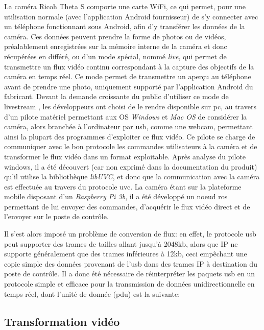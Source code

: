 			La caméra Ricoh Theta S comporte une carte WiFi, ce qui permet, pour une utilisation \og normale \fg{} (avec l'application Android fournisseur) de s'y connecter avec un téléphone fonctionnant sous Android, afin d'y transférer les données de la caméra. Ces données peuvent prendre la forme de photos ou de vidéos, préalablement enregistrées sur la mémoire interne de la caméra et donc récupérées en différé, ou d'un mode spécial, nommé \emph{live}, qui permet de transmettre un flux vidéo continu correspondant à la capture des objectifs de la caméra en temps réel. Ce mode permet de transmettre un aperçu au téléphone avant de prendre une photo, uniquement supporté par l'application Android du fabricant. Devant la demande croissante du public d'utiliser ce mode de \og livestream \fg{}, les développeurs ont choisi de le rendre disponible sur pc, au travers d'un pilote matériel permettant aux OS \emph{Windows} et \emph{Mac OS} de considérer la caméra, alors branchée à l'ordinateur par \gls{usb}, comme une webcam, permettant ainsi la plupart des programmes d'exploiter ce flux vidéo. Ce pilote se charge de communiquer avec le bon protocole les commandes utilisateurs à la caméra et de transformer le flux vidéo dans un format exploitable. Après analyse du pilote windows, il a été découvert (car non exprimé dans la documentation du produit) qu'il utilise la bibliothèque \emph{libUVC}, et donc que la communication avec la caméra est effectuée au travers du protocole \gls{uvc}. La caméra étant sur la plateforme mobile disposant d'un \emph{Raspberry Pi 3b}, il a été développé un noeud \gls{ros} permettant de lui envoyer des commandes, d'acquérir le flux vidéo direct et de l'envoyer sur le poste de contrôle.
			\par
			Il s'est alors imposé un problème de conversion de flux: en effet, le protocole \gls{usb} peut supporter des trames de tailles allant jusqu'à 2048kb, alors que IP ne supporte généralement que des trames inférieures à 12kb, ceci empêchant une copie simple des données provenant de l'\gls{usb} dans des trames IP à destination du poste de contrôle. Il a donc été nécessaire de réinterpréter les paquets \gls{usb} en un protocole simple et efficace pour la transmission de données unidirectionnelle en temps réel, dont l'unité de donnée (\gls{pdu}) est la suivante:
			
			
		\subsection{Transformation vidéo}
		
